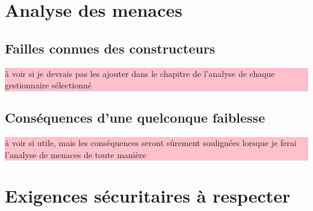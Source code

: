 \section{Analyse des menaces}
\subsection{Failles connues des constructeurs}
\colorbox{pink}{\parbox{15cm}{à voir si je devrais pas les ajouter dans le chapitre de l'analyse de chaque gestionnaire sélectionné}}
\subsection{Conséquences d'une quelconque faiblesse}
\colorbox{pink}{\parbox{15cm}{à voir si utile, mais les conséquences seront sûrement soulignées lorsque je ferai l'analyse de menaces de toute manière}}
\section{Exigences sécuritaires à respecter}